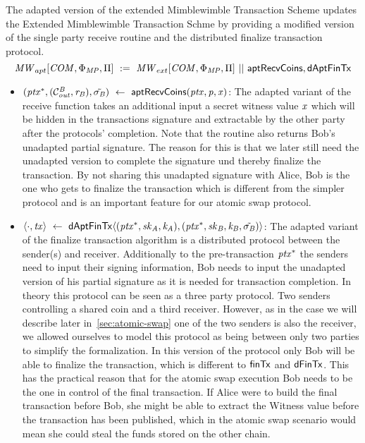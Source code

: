 \begin{definition}
    \label{def:apt-ext-mw-tx-scheme}
    The adapted version of the extended Mimblewimble Transaction Scheme updates the Extended Mimblewimble Transaction Schme by providing a modified version of the single party receive routine and the distributed finalize transaction protocol.
    \[ \mathit{MW}_{apt}[\mathit{COM},\Phi_{\mathit{MP}},\Pi] ~:=~ \mathit{MW}_{ext}[\mathit{COM},\Phi_{\mathit{MP}},\Pi] ~||~ \mathsf{aptRecvCoins}, \mathsf{dAptFinTx} \]
    \begin{itemize}
        \item $(\mathit{ptx}^*, (\mathcal{C}_{\mathit{out}}^{\mathit{B}},\mathit{r}_{\mathit{B}}), \tilde{\sigma_{\mathit{B}}}) ~\leftarrow~ \mathsf{aptRecvCoins}(\mathit{ptx},\mathit{p},\mathit{x})$: The adapted variant of the receive function takes an additional input a secret witness value
        $\mathit{x}$ which will be hidden in the transactions signature and extractable by the other party after the protocols' completion.
        Note that the routine also returns Bob's unadapted partial signature.
        The reason for this is that we later still need the unadapted version to complete the signature und thereby finalize the transaction.
        By not sharing this unadapted signature with Alice, Bob is the one who gets to finalize the transaction which is different from the simpler protocol and is an important feature for our atomic swap protocol.
        \item $\langle \cdot, \mathit{tx} \rangle ~\leftarrow~ \mathsf{dAptFinTx} \langle (\mathit{ptx}^*,\mathit{sk}_{\mathit{A}},\mathit{\mathit{k}_{\mathit{A}}}), (\mathit{ptx}^*,\mathit{sk}_{\mathit{B}},\mathit{\mathit{k}_{\mathit{B}}},\tilde{\sigma_{\mathit{B}}}) \rangle$: The adapted variant of the finalize transaction algorithm is a distributed protocol between the sender(s) and receiver.
        Additionally to the pre-transaction $\mathit{ptx}^*$ the senders need to input their signing information, Bob needs to input the unadapted version of his partial signature as it is needed for transaction completion.
        In theory this protocol can be seen as a three party protocol.
        Two senders controlling a shared coin and a third receiver.
        However, as in the case we will describe later in~\ref{sec:atomic-swap} one of the two senders is also the receiver, we allowed ourselves to model this protocol as being between only two parties to simplify the formalization.
        In this version of the protocol only Bob will be able to finalize the transaction, which is different to $\mathsf{finTx}$ and $\mathsf{dFinTx}$.
        This has the practical reason that for the atomic swap execution Bob needs to be the one in control of the final transaction.
        If Alice were to build the final transaction before Bob, she might be able to extract the Witness value before the transaction has been published, which in the atomic swap scenario would mean she could steal the funds stored on the other chain.
    \end{itemize}
\end{definition}

